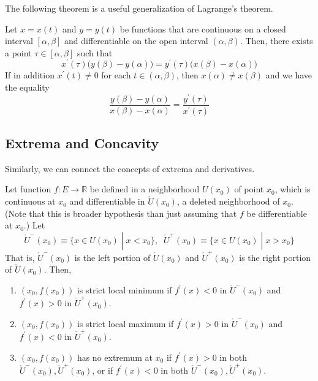   The following theorem is a useful generalization of Lagrange's theorem. 

  \begin{theorem}
    Let $x = x(t)$ and $y = y(t)$ be functions that are continuous on a closed interval $[\alpha, \beta]$ and differentiable on the open interval $(\alpha, \beta)$. Then, there exists a point $\tau \in [\alpha, \beta]$ such that
    \begin{equation}
      x^\prime (\tau) \big( y(\beta) - y (\alpha)\big) = y^\prime (\tau) \big( x(\beta) - x(\alpha)\big)
    \end{equation}
    If in addition $x^\prime (t) \neq 0$ for each $t \in (\alpha, \beta)$, then $x(\alpha) \neq x(\beta)$ and we have the equality 
    \begin{equation}
      \frac{y(\beta) - y(\alpha)}{x(\beta) - x(\alpha)} = \frac{y^\prime (\tau)}{x^\prime (\tau)}
    \end{equation}
  \end{theorem}

\subsection{Extrema and Concavity}

  Similarly, we can connect the concepts of extrema and derivatives. 

  \begin{theorem}
    Let function $f: E \longrightarrow \mathbb{R}$ be defined in a neighborhood $U(x_0)$ of point $x_0$, which is continuous at $x_0$ and differentiable in $\mathring{U}(x_0)$, a deleted neighborhood of $x_0$. (Note that this is broader hypothesis than just assuming that $f$ be differentiable at $x_0$.) Let
    \[\mathring{U}^- (x_0) \equiv \{x \in U(x_0) \;|\; x < x_0\}, \;\; \mathring{U}^+ (x_0) \equiv \{x \in U(x_0) \;|\; x > x_0\}\]
    That is, $\mathring{U}^- (x_0)$ is the left portion of $\mathring{U}(x_0)$ and $\mathring{U}^+ (x_0)$ is the right portion of $\mathring{U}(x_0)$. Then, 
    \begin{enumerate}
      \item $(x_0, f(x_0))$ is strict local minimum if $f^\prime(x) < 0$ in $\mathring{U}^- (x_0)$ and $f^\prime (x) > 0$ in $\mathring{U}^+ (x_0)$. 

      \item $(x_0, f(x_0))$ is strict local maximum if $f^\prime(x) > 0$ in $\mathring{U}^- (x_0)$ and $f^\prime (x) < 0$ in $\mathring{U}^+ (x_0)$. 

      \item $(x_0, f(x_0))$ has no extremum at $x_0$ if $f^\prime (x) > 0$ in both $\mathring{U}^- (x_0), \mathring{U}^+ (x_0)$, or if $f^\prime(x)< 0$ in both $\mathring{U}^- (x_0), \mathring{U}^+ (x_0)$. 
    \end{enumerate}
  \end{theorem}

